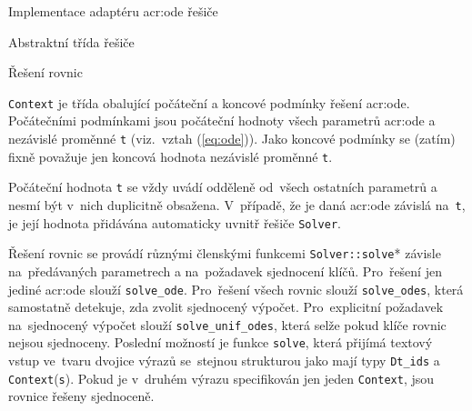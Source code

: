 \documentclass[thesis=M,czech]{FITthesis}[2012/06/26]
\newcommand{\acrlabel}[1]{acr:#1}
\newcommand{\acr}[1]{\acrshort{\acrlabel{#1}}}
\newcommand{\id}[1]{\texttt{#1}}
\newcommand{\rf}[1]{\ref{#1}}
\newcommand{\rfeq}[1]{(\rf{eq:#1})}
\begin{document}
\begin{section}{Implementace adaptéru \acr{ode} řešiče}
\begin{subsection}{Abstraktní třída řešiče}
\begin{subsubsection}{Řešení rovnic}

\begin{paragraph}{\id{Context}}\label{p:impl:ode:solver:solve:ctx}
je třída obalující počáteční a koncové podmínky
řešení \acr{ode}.
Počátečními podmínkami
jsou počáteční hodnoty všech parametrů \acr{ode}
a nezávislé proměnné \id{t}
(viz.~vztah \rfeq{ode}).
Jako koncové podmínky se (zatím)
fixně považuje jen koncová hodnota
nezávislé proměnné \id{t}.

Počáteční hodnota \id{t} se vždy uvádí
odděleně od~všech ostatních parametrů
a nesmí být v~nich duplicitně obsažena.
V~případě, že je daná \acr{ode}
závislá na~\id{t},
je její hodnota přidávána automaticky
uvnitř řešiče \id{Solver}.
\end{paragraph} %


\bigskip

Řešení rovnic se provádí různými členskými funkcemi
\id{Solver::\-solve}*
závisle na~předávaných parametrech
a na~požadavek sjednocení klíčů.
Pro~řešení jen jediné \acr{ode}
slouží \id{solve\_\-ode}.
Pro~řešení všech rovnic
slouží \id{solve\_\-odes},
která samostatně detekuje,
zda zvolit sjednocený výpočet.
Pro~explicitní požadavek na~sjednocený výpočet
slouží \id{solve\_\-unif\_\-odes},
která selže pokud klíče rovnic nejsou sjednoceny.
Poslední možností je funkce \id{solve},
která přijímá textový vstup
ve~tvaru dvojice výrazů
se~stejnou strukturou jako mají typy
\id{Dt\_\-ids} a \id{Context}(\id{s}).
Pokud je v~druhém výrazu specifikován jen jeden \id{Context},
jsou rovnice řešeny sjednoceně.
\end{subsubsection} %



\end{subsection}
\end{section}
\end{document}
